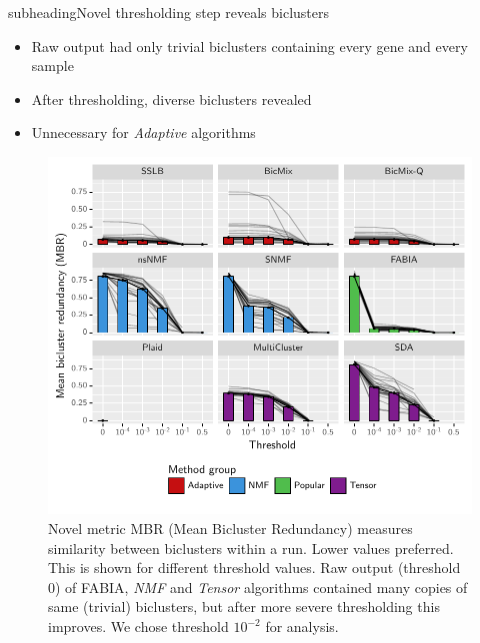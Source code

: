 \documentclass[xcolor=table,final]{beamer}
\newlength{\onecolwid}
\newlength{\twocolwid}
\newcommand{\kcnsubheading}[1]{\begin{beamercolorbox}[rounded=true]{subheading}{\large #1}\end{beamercolorbox}}
\begin{document}
\begin{frame}[t]
\begin{columns}[t]
\begin{column}{\twocolwid}
\begin{columns}
\begin{column}{\onecolwid}
\kcnsubheading{Novel thresholding step reveals biclusters}

\begin{itemize}
    \item Raw output had only trivial biclusters containing every gene and every sample
    \item After thresholding, diverse biclusters revealed
    \item Unnecessary for \textit{Adaptive} algorithms
\end{itemize}

\begin{figure}
\includegraphics[width=0.9 \textwidth]{plots/threshold_adjusted_redundancy_mean_lines.pdf}
\caption{Novel metric MBR (Mean Bicluster Redundancy) measures similarity between biclusters within a run. Lower values preferred. This is shown for different threshold values. Raw output (threshold 0) of FABIA, \textit{NMF} and \textit{Tensor} algorithms contained many copies of same (trivial) biclusters, but after more severe thresholding this improves. We chose threshold $10^{-2}$ for analysis.}
\end{figure}


\end{column}
\end{columns}
\end{column}
\end{columns}
\end{frame}
\end{document}
